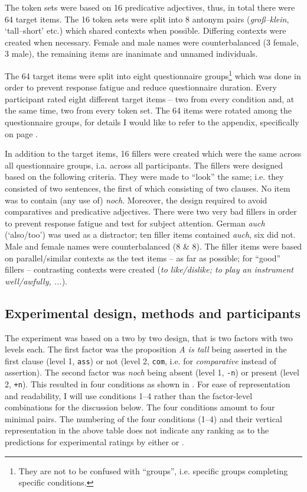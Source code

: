 \documentclass[output=paper]{langsci/langscibook}
\begin{document}
The token sets were based on 16 predicative adjectives, thus, in total there were 64 target items. The 16 token sets were split into 8 antonym pairs (\textit{groß--klein}, `tall--short' etc.) which shared contexts when possible. Differing contexts were created when necessary. Female and male names were counterbalanced (3 female, 3 male), the remaining items are inanimate and unnamed individuals.

The 64 target items were split into eight questionnaire groups\footnote{They are not to be confused with ``groups'', i.e. specific groups completing specific conditions.} which was done in order to prevent response fatigue and reduce questionnaire duration. Every participant rated eight different target items -- two from every condition and, at the same time, two from every token set. The 64 items were rotated among the questionnaire groups, for details I would like to refer to the appendix, specifically  on page \pageref{tab:questionnaire_combos}.

In addition to the target items, 16 fillers were created which were the same across all questionnaire groups, i.a. across all participants. The fillers were designed based on the following criteria. They were made to ``look'' the same; i.e. they consisted of two sentences, the first of which consisting of two clauses. No item was to contain (any use of) \textit{noch}. Moreover, the design required to avoid comparatives and predicative adjectives. There were two very bad fillers in order to prevent response fatigue and test for subject attention. German \textit{auch} (`also\slash too') was used as a distractor; ten filler items contained \textit{auch}, six did not. Male and female names were counterbalanced (8 \& 8). The filler items were based on parallel/similar contexts as the test items -- as far as possible; for ``good'' fillers -- contrasting contexts were created (\textit{to like/dislike; to play an instrument well/awfully, ...}).


\subsection{Experimental design, methods and participants}\label{experimental_design_and_methods}

The experiment was based on a two by two design, that is two factors with two levels each. The first factor was the proposition \textit{A is tall} being asserted in the first clause (level 1, \texttt{ass}) or not (level 2, \texttt{com}, i.e. for \textit{comparative} instead of assertion). The second factor was \textit{noch} being absent (level 1, \texttt{-n}) or present (level 2, \texttt{+n}). This resulted in four conditions as shown in . For ease of representation and readability, I will use conditions 1--4 rather than the factor-level combinations for the discussion below. The four conditions amount to four minimal pairs. The numbering of the four conditions (1--4) and their vertical representation in the above table does not indicate any ranking as to the predictions for experimental ratings by either \citeauthor{umbach2009a_comp} or \citeauthor{Hofstetter2013}.
\end{document}
